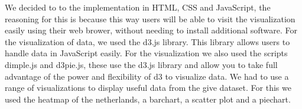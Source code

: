 \documentclass[a4paper,twoside,11pt]{article}
\begin{document}
We decided to to the implementation in HTML, CSS and JavaScript, the reasoning for this is because this way users will be able to visit the visualization easily using their web brower, without needing to install additional software. \newline
For the visualization of data, we used the d3.js library. This library allows users to handle data in JavaScript easily. For the visualization we also used the scripts dimple.js and d3pie.js, these use the d3.js library and allow you to take full advantage of the power and flexibility of d3 to visualize data. \newline
We had to use a range of visualizations to display useful data from the give dataset. For this we used the heatmap of the netherlands, a barchart, a scatter plot and a piechart. \newline
\end{document}
